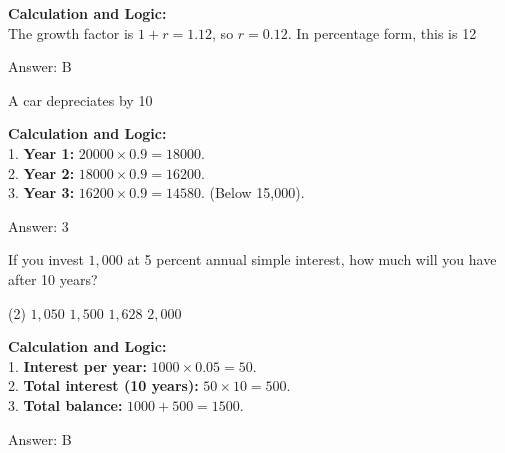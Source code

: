 \documentclass[11pt,paper=a4,answers]{exam}
\begin{document}
\begin{questions}
\begin{solution}
\textbf{Calculation and Logic:} \\
The growth factor is $1 + r = 1.12$, so $r = 0.12$. In percentage form, this is 12%

\vspace{30pt}

Answer: \colorbox{yellow!100}{B}
\end{solution}

\vspace{60pt}

\question
A car depreciates by 10%

\begin{solution}
\textbf{Calculation and Logic:} \\
1. \textbf{Year 1:} $20000 \times 0.9 = 18000$. \\
2. \textbf{Year 2:} $18000 \times 0.9 = 16200$. \\
3. \textbf{Year 3:} $16200 \times 0.9 = 14580$. (Below 15,000).

\vspace{30pt}

Answer: \colorbox{yellow!100}{3}
\end{solution}

\vspace{60pt}

\question
If you invest $1,000$ at 5 percent annual simple interest, how much will you have after 10 years?
\begin{tasks}(2)
    \task $1,050$
    \task $1,500$
    \task $1,628$
    \task $2,000$
\end{tasks}

\begin{solution}
\textbf{Calculation and Logic:} \\
1. \textbf{Interest per year:} $1000 \times 0.05 = 50$. \\
2. \textbf{Total interest (10 years):} $50 \times 10 = 500$. \\
3. \textbf{Total balance:} $1000 + 500 = 1500$.

\vspace{30pt}

Answer: \colorbox{yellow!100}{B}
\end{solution}


\end{questions}
\end{document}
